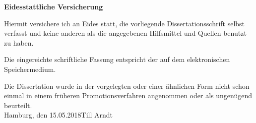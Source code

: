 
\begin{declaration}
\centerline{\large \bf{Eidesstattliche Versicherung}}
\bigskip
Hiermit versichere ich an Eides statt, die vorliegende Dissertationsschrift selbst verfasst und keine anderen als die angegebenen Hilfsmittel und Quellen benutzt zu haben.

Die eingereichte schriftliche Fassung entspricht der auf dem elektronischen Speichermedium.

Die Dissertation wurde in der vorgelegten oder einer \"{a}hnlichen Form nicht schon einmal in einem fr\"{u}heren Promotionsverfahren angenommen oder als ungen\"{u}gend beurteilt.\\

Hamburg, den 15.05.2018\hspace{6.5cm}Till Arndt\\


\end{declaration}

